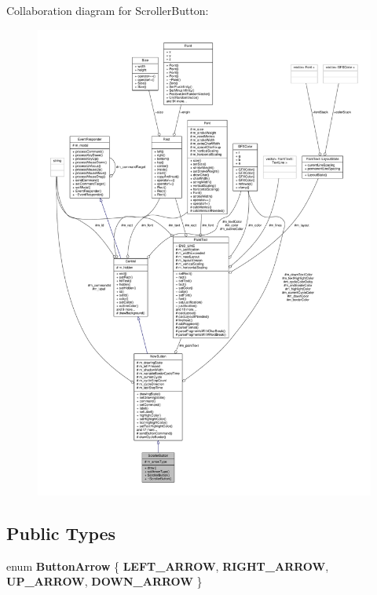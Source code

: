 Collaboration diagram for Scroller\+Button\+:
\nopagebreak
\begin{figure}[H]
\begin{center}
\leavevmode
\includegraphics[width=350pt]{d9/d56/classScrollerButton__coll__graph}
\end{center}
\end{figure}
\subsection*{Public Types}
\begin{DoxyCompactItemize}
\item 
enum {\bfseries Button\+Arrow} \{ {\bfseries L\+E\+F\+T\+\_\+\+A\+R\+R\+OW}, 
{\bfseries R\+I\+G\+H\+T\+\_\+\+A\+R\+R\+OW}, 
{\bfseries U\+P\+\_\+\+A\+R\+R\+OW}, 
{\bfseries D\+O\+W\+N\+\_\+\+A\+R\+R\+OW}
 \}\hypertarget{classScrollerButton_a811b376b2aaace8889b59657b8a51509}{}\label{classScrollerButton_a811b376b2aaace8889b59657b8a51509}

\end{DoxyCompactItemize}
